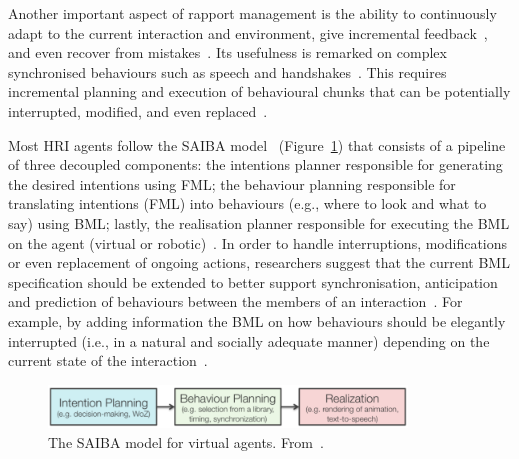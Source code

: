 Another important aspect of rapport management is the ability to continuously adapt to the current interaction and environment, give incremental feedback~\cite{Kopp2007, Zwiers2011, Reidsma2011, Visser2014}, and even recover from mistakes~\cite{Kahn2008}. Its usefulness is remarked on complex synchronised behaviours such as speech and handshakes~\cite{Zwiers2011}. This requires incremental planning and execution of behavioural chunks that can be potentially interrupted, modified, and even replaced~\cite{Reidsma2011, Visser2014, Kopp2007, Zwiers2011}. 

Most \ac{HRI} agents follow the SAIBA model~\cite{Niewiadomski2009,Buschmeier2011,Hartholt2013,Tullio2015} (Figure~\ref{fig:saiba}) that consists of a pipeline of three decoupled components: the intentions planner responsible for generating the desired intentions using \ac{FML}; the behaviour planning responsible for translating intentions (\ac{FML}) into behaviours (e.g., where to look and what to say) using \ac{BML}; lastly, the realisation planner responsible for executing the \ac{BML} on the agent (virtual or robotic)~\cite{Kopp2006}. In order to handle interruptions, modifications or even replacement of ongoing actions, researchers suggest that the current \ac{BML} specification should be extended to better support synchronisation, anticipation and prediction of behaviours between the members of an interaction~\cite{Kopp2006, Kopp2007, Zwiers2011, Reidsma2011}. For example, by adding information the BML on how behaviours should be elegantly interrupted (i.e., in a natural and socially adequate manner) depending on the current state of the interaction~\cite{Zwiers2011}.

\begin{figure}[H]
	\centering
	\includegraphics[width=0.85\textwidth]{images/SAIBA.png}
	\caption{The SAIBA model for virtual agents. From~\cite{Tullio2015}.}
	\label{fig:saiba}
\end{figure}



